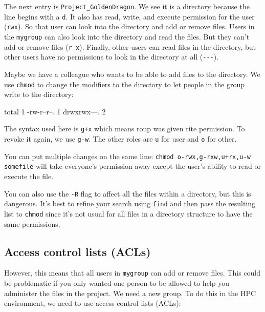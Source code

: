 The next entry is \lstinline|Project_GoldenDragon|. We see it is a directory because the
line begins with a \lstinline|d|. It also has read, write, and execute permission for
the \texttt{\userid} user (\lstinline|rwx|). So that user can look into the directory and add
or remove files. Users in the \lstinline|mygroup| can also look into the directory and
read the files. But they can't add or remove files (\lstinline|r-x|). Finally, other
users can read files in the directory, but other users have no permissions to
look in the directory at all (\lstinline|---|).

Maybe we have a colleague who wants to be able to add files to the directory. We
use \lstinline|chmod| to change the modifiers to the directory to let people in the
group write to the directory:

\begin{prompt}
total 1
-rw-r--r--. 1 %
drwxrwx---. 2 %
\end{prompt}

The syntax used here is \lstinline|g+x| which means roup was given rite
permission. To revoke it again, we use \lstinline|g-w|. The other roles are \lstinline|u| for
user and \lstinline|o| for other.

You can put multiple changes on the same line: \lstinline|chmod o-rwx,g-rxw,u+rx,u-w somefile|
will take everyone's permission away except the user's ability to
read or execute the file.

You can also use the \lstinline|-R| flag to affect all the files within a directory, but this
is dangerous. It's best to refine your search using \lstinline|find| and then pass the
resulting list to \lstinline|chmod| since it's not usual for all files in a directory
structure to have the same permissions.

\subsection{Access control lists (ACLs)}

However, this means that all users in \lstinline|mygroup| can add or remove files. This
could be problematic if you only wanted one person to be allowed to help you
administer the files in the project. We need a new group. To do this in the HPC
environment, we need to use access control lists (ACLs):

